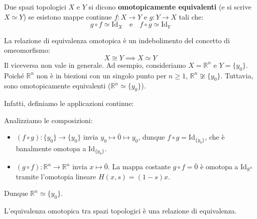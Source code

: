 \begin{definicion}
Due spazi topologici $X$ e $Y$ si dicono \textbf{omotopicamente equivalenti} (e si scrive $X \simeq Y$) se esistono mappe continue $f: X \to Y$ e $g: Y \to X$ tali che:
\[
g \circ f \simeq \mathrm{Id}_X \quad \text{e} \quad f \circ g \simeq \mathrm{Id}_Y
\]
\end{definicion}

\begin{observacion}
La relazione di equivalenza omotopica è un indebolimento del concetto di omeomorfismo:
\[
X \cong Y \implies X \simeq Y
\]
Il viceversa non vale in generale. Ad esempio, consideriamo $X = \mathbb{R}^n$ e $Y = \{y_0\}$. Poiché $\mathbb{R}^n$ non è in biezioni con un singolo punto per $n \geqslant 1$, $\mathbb{R}^n \not\cong \{y_0\}$. Tuttavia, sono omotopicamente equivalenti ($\mathbb{R}^n \simeq \{y_0\}$).

Infatti, definiamo le applicazioni continue:

Analizziamo le composizioni:
\begin{itemize}
    \item $(f \circ g): \{y_0\} \to \{y_0\}$ invia $y_0 \mapsto \bar{0} \mapsto y_0$, dunque $f \circ g = \mathrm{Id}_{\{y_0\}}$, che è banalmente omotopa a $\mathrm{Id}_{\{y_0\}}$.
    \item $(g \circ f): \mathbb{R}^n \to \mathbb{R}^n$ invia $x \mapsto \bar{0}$. La mappa costante $g \circ f = \bar{0}$ è omotopa a $\mathrm{Id}_{\mathbb{R}^n}$ tramite l'omotopia lineare $H(x,s) = (1-s)x$.
\end{itemize}
Dunque $\mathbb{R}^n \simeq \{y_0\}$.
\end{observacion}

\begin{teo}
L'equivalenza omotopica tra spazi topologici è una relazione di equivalenza.
\end{teo}

